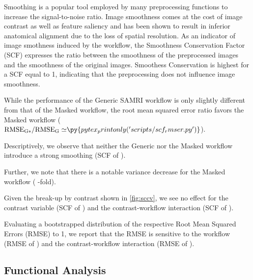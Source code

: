 
Smoothing is a popular tool employed by many preprocessing functions to increase the signal-to-noise ratio.
Image smoothness comes at the cost of image contrast as well as feature saliency and has been shown to result in inferior anatomical alignment \cite{fmriprep} due to the loss of spatial resolution.
As an indicator of image smothness induced by the workflow, the Smoothness Conservation Factor (SCF) \cite{ioanas_optimized_2019} expresses the ratio between the smoothness of the preprocessed images and the smoothness of the original images.
Smoothess Conservation is highest for a SCF equal to 1, indicating that the preprocessing does not influence image smoothness.

While the performance of the Generic SAMRI workflow is only slightly different from that of the Masked workflow, the root mean squared error ratio favors the Masked workflow ($\mathrm{RMSE_{G*}/RMSE_{G}\simeq} \py{pytex_printonly('scripts/scf_rmser.py')}$).

Descriptively, we observe that neither the Generic nor the Masked workflow introduce a strong smoothing (SCF of ).

Further, we note that there is a notable variance decrease for the Masked workflow
(
-fold).

Given the break-up by contrast shown in \cref{fig:sccv}, we see no effect for the contrast variable
(SCF of )
and the contrast-workflow interaction
(SCF of ).

Evaluating a bootstrapped distribution of the respective Root Mean Squared Errors (RMSE) to 1, we report that the RMSE is sensitive to the
workflow (RMSE of )
and the contrast-workflow interaction (RMSE of ).

\subsection{Functional Analysis}

